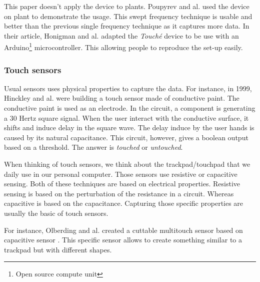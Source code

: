 This paper doesn't apply the device to plants. Poupyrev and al. \cite{poupyrevBotanicusInteracticusInteractive2012}
used the device on plant to demonstrate the usage. This swept frequency technique is usable and better
than the previous single frequency technique as it captures more data.
In their article, Honigman and al. \cite{honigmanTechniquesSweptFrequencyb} adapted the \textit{Touché}
device to be use with an Arduino\footnote{Open source compute unit} microcontroller. This allowing people
to reproduce the set-up easily.



\subsubsection{Touch sensors}

Usual sensors uses physical properties to capture the data. For instance, in 1999, Hinckley and al. \cite{hinckleyTouchsensingInputDevices1999}
were building a touch sensor made of conductive paint. The conductive paint is used as an electrode.
In the circuit, a component is generating a 30 Hertz square signal. When the user interact with the conductive surface,
it shifts and induce delay in the square wave. The delay induce by the user hands is caused by its natural
capacitance. This circuit, however, gives a boolean output based on a threshold. The answer is \textit{touched}
or \textit{untouched}. %

When thinking of touch sensors, we think about the trackpad/touchpad that we daily use in our personal
computer. Those sensors use resistive or capacitive sensing. Both of these techniques are based on electrical
properties. Resistive sensing is based on the perturbation of the resistance in a circuit. Whereas
capacitive is based on the capacitance. Capturing those specific properties are usually the basic of
touch sensors.

For instance, Olberding and al. created a cuttable multitouch sensor based on capacitive sensor \cite{olberdingCuttableMultitouchSensor2013}.
This specific sensor allows to create something similar to a trackpad but with different shapes.

